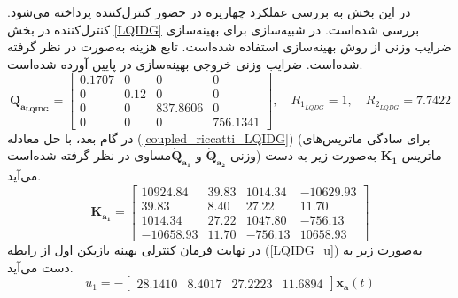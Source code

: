  در این بخش به بررسی عملکرد چهارپره در حضور کنترل‌کننده  پرداخته می‌شود. کنترل‌کننده  در بخش
\ref{LQIDG}
بررسی شده‌است.
 در شبیه‌سازی برای بهینه‌سازی ضرایب وزنی  از روش بهینه‌سازی
 \cite{Karimi2010}
استفاده شده‌است.
تابع هزینه  به‌صورت
در نظر گرفته شده‌است. ضرایب وزنی خروجی بهینه‌سازی در پایین آورده شده‌است.
\begin{equation}
	\boldsymbol{Q_{a_{LQIDG}}} = \begin{bmatrix}
		0.1707 &0& 0& 0\\
		0 &  0.12 & 0 &0 \\
		0 & 0 & 837.8606 & 0\\
		0 & 0 & 0 & 756.1341
	\end{bmatrix}, \quad R_{1_{LQDG}} =  1, \quad R_{2_{LQDG}} =  7.7422
\end{equation}
در گام بعد، با حل معادله
(\ref{coupled_riccatti_LQIDG})
(برای سادگی ماتریس‌های وزنی $\boldsymbol{\dot{Q}_{a_2}}$ و $\boldsymbol{\dot{Q}_{a_1}}$مساوی در نظر گرفته شده‌است)
ماتریس
$\boldsymbol{\dot{K}_1}$
به‌صورت زیر به دست می‌آید.
\begin{equation}
	\boldsymbol{K_{a_1}} = \begin{bmatrix}
		10924.84&   39.83 & 1014.34 & -10629.93\\
		39.83   &  8.40 & 27.22& 11.70\\
		1014.34 &  27.22 & 1047.80 & -756.13\\
		-10658.93 & 11.70 & -756.13 & 10658.93
	\end{bmatrix}
\end{equation}
در نهایت فرمان کنترلی بهینه بازیکن اول از رابطه
(\ref{LQIDG_u})
به‌صورت زیر به دست می‌آید.
\begin{equation}
	u_1 = -\begin{bmatrix}
		28.1410 &   8.4017  & 27.2223  & 11.6894
	\end{bmatrix}\boldsymbol{x_{a}}(t)
\end{equation}

